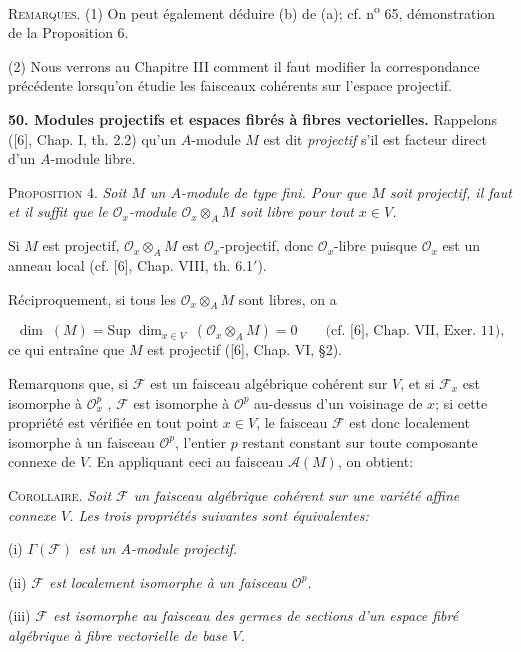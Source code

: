 \textsc{Remarques}. (1) On peut également déduire (b) de (a); cf. n\textsuperscript{o} 65, démonstration de la Proposition 6.

(2) Nous verrons au Chapitre III comment il faut modifier la correspondance précédente lorsqu'on étudie les faisceaux cohérents sur l'espace projectif.

\textbf{50. Modules projectifs et espaces fibrés à fibres vectorielles.} Rappelons ([6], Chap. I, th. 2.2) qu'un $A$-module $M$ est dit \textit{projectif} s'il est facteur direct d'un $A$-module libre.

\textsc{Proposition} 4. \textit{Soit $M$ un $A$-module de type fini. Pour que $M$ soit projectif, il faut et il suffit que le $\mathcal{O}_x$-module $\mathcal{O}_x \otimes_A M$ soit libre pour tout $x \in V$.}

Si $M$ est projectif, $\mathcal{O}_x \otimes_A M$ est $\mathcal{O}_x$-projectif, donc $\mathcal{O}_x$-libre puisque $\mathcal{O}_x$ est un anneau local (cf. [6], Chap. VIII, th. 6.1$'$).

Réciproquement, si tous les $\mathcal{O}_x \otimes_A M$ sont libres, on a

\begin{equation*}
\dim\;(M) = \mathrm{Sup}\;\dim_{x \in V}\;(\mathcal{O}_x \otimes_A M) = 0 \qquad \mbox{(cf. [6], Chap. VII, Exer. 11),}
\end{equation*}
ce qui entraîne que $M$ est projectif ([6], Chap. VI, \S2).

Remarquons que, si $\mathcal{F}$ est un faisceau algébrique cohérent sur $V$, et si $\mathcal{F}_x$ est isomorphe à $\mathcal{O}^p_x$ , $\mathcal{F}$ est isomorphe à $\mathcal{O}^p$ au-dessus d'un voisinage de $x$; si cette propriété est vérifiée en tout point $x \in V$, le faisceau $\mathcal{F}$ est donc localement isomorphe à un faisceau $\mathcal{O}^p$, l'entier $p$ restant constant sur toute composante connexe de $V$. En appliquant ceci au faisceau $\mathcal{A}(M)$, on obtient:

\textsc{Corollaire}. \textit{Soit $\mathcal{F}$ un faisceau algébrique cohérent sur une variété affine connexe $V$. Les trois propriétés suivantes sont équivalentes:}

(i) \textit{$\Gamma(\mathcal{F})$ est un $A$-module projectif.}

(ii) \textit{$\mathcal{F}$ est localement isomorphe à un faisceau $\mathcal{O}^p$.}

(iii) \textit{$\mathcal{F}$ est isomorphe au faisceau des germes de sections d'un espace fibré algébrique à fibre vectorielle de base $V$.}



